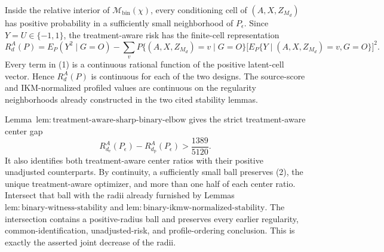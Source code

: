 Inside the relative interior of \(\mathcal M_{\mathrm{bin}}(\chi)\), every conditioning cell of \((A,X,Z_{M_d})\) has positive probability in a sufficiently small neighborhood of \(P_\epsilon\). Since \(Y=U\in\{-1,1\}\), the treatment-aware risk has the finite-cell representation
\[
 R_d^A(P)=E_P(Y^2\mid G=O)
 -\sum_v P\{(A,X,Z_{M_d})=v\mid G=O\}
 \bigl[E_P\{Y\mid (A,X,Z_{M_d})=v,G=O\}\bigr]^2. \tag{1}
\]
Every term in (1) is a continuous rational function of the positive latent-cell vector. Hence \(R_d^A(P)\) is continuous for each of the two designs. The source-score and IKM-normalized profiled values are continuous on the regularity neighborhoods already constructed in the two cited stability lemmas.

Lemma~\(\mathrm{lem{:}treatment\text{-}aware\text{-}sharp\text{-}binary\text{-}elbow}\) gives the strict treatment-aware center gap
\[
 R_{d_{\mathrm e}}^A(P_\epsilon)-R_{d_{\mathrm p}}^A(P_\epsilon)
 >\frac{1389}{5120}. \tag{2}
\]
It also identifies both treatment-aware center ratios with their positive unadjusted counterparts. By continuity, a sufficiently small ball preserves (2), the unique treatment-aware optimizer, and more than one half of each center ratio. Intersect that ball with the radii already furnished by Lemmas~\(\mathrm{lem{:}binary\text{-}witness\text{-}stability}\) and \(\mathrm{lem{:}binary\text{-}ikmw\text{-}normalized\text{-}stability}\). The intersection contains a positive-radius ball and preserves every earlier regularity, common-identification, unadjusted-risk, and profile-ordering conclusion. This is exactly the asserted joint decrease of the radii.